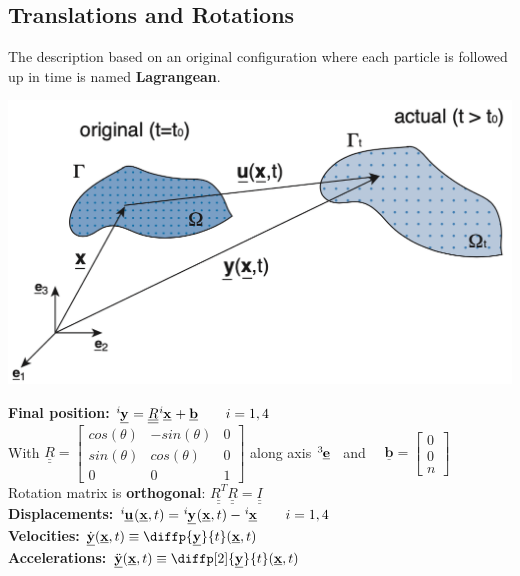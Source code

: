 \subsection*{Translations and Rotations}
\smallskip
The description based on an original configuration where each particle is followed up in time is named \textbf{Lagrangean}.\\

\begin{center}
\includegraphics[width=0.5\linewidth]{img/Configurations} \\
\end{center}

\textbf{Final position:} {$\tensor[^i]{\underline{\mathbf{y}}}{} = {\underline{\underline{R}}} \tensor[^i]{\underline{\mathbf{x}}}{} + \underline{\mathbf{b}} \qquad i = 1,4 $} \\
With $ {\underline{\underline{R}}} = \left[\begin{array}{ccc}cos(\theta) & -sin(\theta) & 0 \\sin(\theta) & cos(\theta) & 0 \\0 & 0 & 1\end{array}\right]$ along axis $ \tensor[^3]{\underline{\mathbf{e}}}{}$ \ and $\quad \underline{\mathbf{b}} = \left[\begin{array}{c}0 \\0 \\n\end{array}\right]$ \\

Rotation matrix is \textbf{orthogonal}: $ {\underline{\underline{R^T}}} \underline{\underline{R}} = \underline{\underline{I}}$ \\

\textbf{Displacements:} {$ \tensor[^i]{\underline{\mathbf{u}}}{}(\underline{\mathbf{x}}, t) = \tensor[^i]{\underline{\mathbf{y}}}{}(\underline{\mathbf{x}}, t) - \tensor[^i]{\underline{\mathbf{x}}}{} \qquad i = 1,4 $} \\
\textbf{Velocities:} $\underline{\dot{\mathbf{y}}}(\underline{\mathbf{x}}, t) \equiv \diffp{\underline{\mathbf{y}}}{t}(\underline{\mathbf{x}}, t)$ \\
\textbf{Accelerations:} $\underline{\ddot{\mathbf{y}}}(\underline{\mathbf{x}}, t) \equiv \diffp[2]{\underline{\mathbf{y}}}{t}(\underline{\mathbf{x}}, t)$ \\


